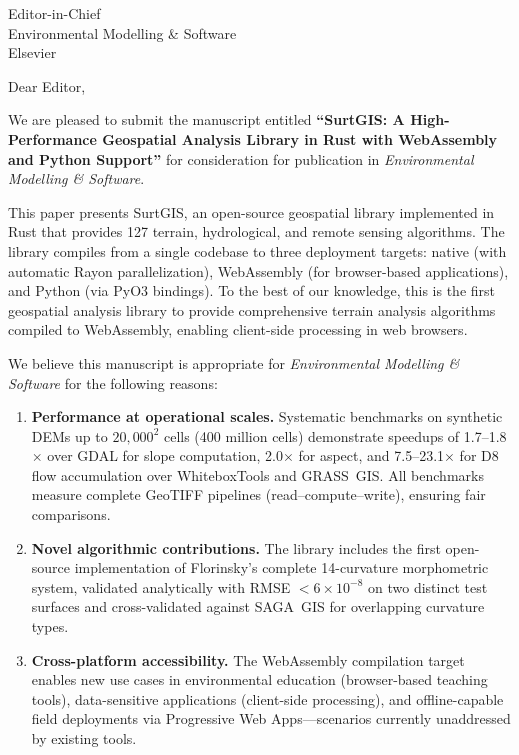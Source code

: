 \documentclass[11pt]{letter}
\date{\today}
\begin{document}
\begin{letter}{Editor-in-Chief\\
Environmental Modelling \& Software\\
Elsevier}

\opening{Dear Editor,}

We are pleased to submit the manuscript entitled \textbf{``SurtGIS: A High-Performance Geospatial Analysis Library in Rust with WebAssembly and Python Support''} for consideration for publication in \textit{Environmental Modelling \& Software}.

This paper presents SurtGIS, an open-source geospatial library implemented in Rust that provides 127 terrain, hydrological, and remote sensing algorithms. The library compiles from a single codebase to three deployment targets: native (with automatic Rayon parallelization), WebAssembly (for browser-based applications), and Python (via PyO3 bindings). To the best of our knowledge, this is the first geospatial analysis library to provide comprehensive terrain analysis algorithms compiled to WebAssembly, enabling client-side processing in web browsers.

We believe this manuscript is appropriate for \textit{Environmental Modelling \& Software} for the following reasons:

\begin{enumerate}
    \item \textbf{Performance at operational scales.} Systematic benchmarks on synthetic DEMs up to $20{,}000^2$ cells (400 million cells) demonstrate speedups of 1.7--1.8$\times$ over GDAL for slope computation, 2.0$\times$ for aspect, and 7.5--23.1$\times$ for D8 flow accumulation over WhiteboxTools and GRASS~GIS. All benchmarks measure complete GeoTIFF pipelines (read--compute--write), ensuring fair comparisons.

    \item \textbf{Novel algorithmic contributions.} The library includes the first open-source implementation of Florinsky's complete 14-curvature morphometric system, validated analytically with RMSE $< 6 \times 10^{-8}$ on two distinct test surfaces and cross-validated against SAGA~GIS for overlapping curvature types.

    \item \textbf{Cross-platform accessibility.} The WebAssembly compilation target enables new use cases in environmental education (browser-based teaching tools), data-sensitive applications (client-side processing), and offline-capable field deployments via Progressive Web Apps---scenarios currently unaddressed by existing tools.


\end{enumerate}
\end{letter}
\end{document}
